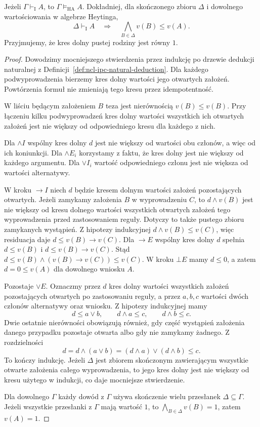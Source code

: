 \begin{twierdzenie}
\label{thm:ncl-heyting-soundness}
Jeżeli $\Gamma\vdash_{\mathrm I} A$, to
$\Gamma\models_{\mathrm{HA}} A$.
Dokładniej, dla skończonego zbioru $\Delta$
i dowolnego wartościowania w algebrze Heytinga,
\[
 \Delta\vdash_{\mathrm I} A
 \quad\Longrightarrow\quad
 \bigwedge_{B\in\Delta}v(B)\leq v(A).
\]
Przyjmujemy, że kres dolny pustej rodziny jest równy $1$.
\end{twierdzenie}
\begin{proof}
Dowodzimy mocniejszego stwierdzenia przez indukcję
po drzewie dedukcji naturalnej z
Definicji~\ref{def:ncl-ipc-natural-deduction}.
Dla każdego podwyprowadzenia bierzemy kres dolny
wartości jego otwartych założeń. Powtórzenia
formuł nie zmieniają tego kresu przez idempotentność.

W liściu będącym założeniem $B$ teza jest
nierównością $v(B)\leq v(B)$.
Przy łączeniu kilku podwyprowadzeń kres dolny
wartości wszystkich ich otwartych założeń
jest nie większy od odpowiedniego kresu
dla każdego z nich.

Dla $\wedge I$ wspólny kres dolny $d$ jest
nie większy od wartości obu członów, a więc
od ich koniunkcji. Dla $\wedge E_i$ korzystamy
z faktu, że kres dolny jest nie większy od
każdego argumentu. Dla $\vee I_i$ wartość
odpowiedniego członu jest nie większa od
wartości alternatywy.

W kroku $\to I$ niech $d$ będzie kresem dolnym
wartości założeń pozostających otwartych.
Jeżeli zamykamy założenia $B$ w wyprowadzeniu $C$,
to $d\wedge v(B)$ jest nie większy od kresu
dolnego wartości wszystkich otwartych założeń
tego wyprowadzenia przed zastosowaniem reguły.
Dotyczy to także pustego zbioru zamykanych wystąpień.
Z hipotezy indukcyjnej
$d\wedge v(B)\leq v(C)$, więc residuacja daje
$d\leq v(B)\to v(C)$.
Dla $\to E$ wspólny kres dolny $d$ spełnia
$d\leq v(B)$ i $d\leq v(B)\to v(C)$.
Stąd $d\leq v(B)\wedge(v(B)\to v(C))\leq v(C)$.
W kroku $\bot E$ mamy $d\leq0$, a zatem
$d=0\leq v(A)$ dla dowolnego wniosku $A$.

Pozostaje $\vee E$. Oznaczmy przez $d$ kres
dolny wartości wszystkich założeń pozostających
otwartych po zastosowaniu reguły, a przez
$a,b,c$ wartości dwóch członów alternatywy
oraz wniosku. Z hipotezy indukcyjnej mamy
\[
 d\leq a\vee b,\qquad d\wedge a\leq c,\qquad
 d\wedge b\leq c.
\]
Dwie ostatnie nierówności obowiązują również,
gdy część wystąpień założenia danego przypadku
pozostaje otwarta albo gdy nie zamykamy żadnego.
Z rozdzielności
\[
 d=d\wedge(a\vee b)
   =(d\wedge a)\vee(d\wedge b)\leq c.
\]
To kończy indukcję.
Jeżeli $\Delta$ jest zbiorem skończonym zawierającym
wszystkie otwarte założenia całego wyprowadzenia,
to jego kres dolny jest nie większy od kresu
użytego w indukcji, co daje mocniejsze stwierdzenie.

Dla dowolnego $\Gamma$ każdy dowód z $\Gamma$
używa skończenie wielu przesłanek
$\Delta\subseteq\Gamma$. Jeżeli wszystkie
przesłanki z $\Gamma$ mają wartość $1$, to
$\bigwedge_{B\in\Delta}v(B)=1$, zatem $v(A)=1$.
\end{proof}

